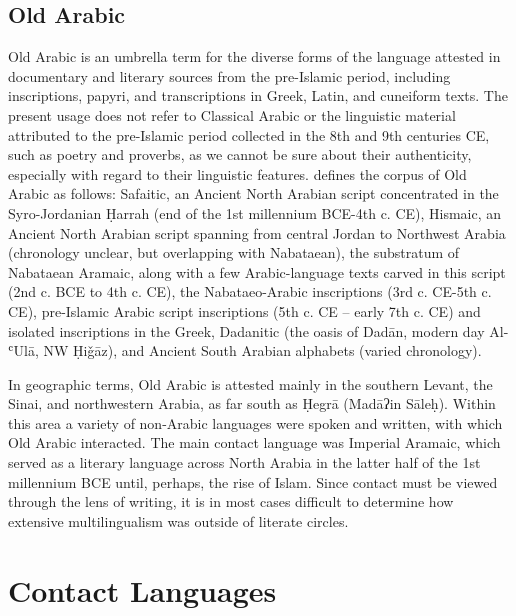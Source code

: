 \documentclass[output=paper]{langsci/langscibook}
\begin{document}
\subsection{Old Arabic}
Old Arabic is an umbrella term for the diverse forms of the language attested in documentary and literary sources from the pre-Islamic period, including inscriptions, papyri, and transcriptions in Greek, Latin, and cuneiform texts. The present usage does not refer to Classical Arabic or the linguistic material attributed to the pre-Islamic period collected in the 8th and 9th centuries CE, such as poetry and proverbs, as we cannot be sure about their authenticity, especially with regard to their linguistic features. \citet{Al-Jallad2017} defines the corpus of Old Arabic as follows: Safaitic, an Ancient North Arabian script concentrated in the Syro-Jordanian Ḥarrah (end of the 1st millennium BCE-4th c. CE), Hismaic, an Ancient North Arabian script spanning from central Jordan to Northwest Arabia (chronology unclear, but overlapping with Nabataean), the substratum of Nabataean Aramaic, along with a few Arabic-language texts carved in this script (2nd c. BCE to 4th c. CE), the Nabataeo-Arabic inscriptions (3rd c. CE-5th c. CE), pre-Islamic Arabic script inscriptions (5th c. CE – early 7th c. CE) and isolated inscriptions in the Greek, Dadanitic (the oasis of Dadān, modern day Al-ʿUlā, NW Ḥiǧāz), and Ancient South Arabian alphabets (varied chronology). 

In geographic terms, Old Arabic is attested mainly in the southern Levant, the Sinai, and northwestern Arabia, as far south as Ḥegrā (Madāʔin Sāleḥ). Within this area a variety of non-Arabic languages were spoken and written, with which Old Arabic interacted. The main contact language was Imperial Aramaic, which served as a literary language across North Arabia in the latter half of the 1st millennium BCE until, perhaps, the rise of Islam. Since contact must be viewed through the lens of writing, it is in most cases difficult to determine how extensive multilingualism was outside of literate circles.

\section{Contact Languages}
\end{document}

